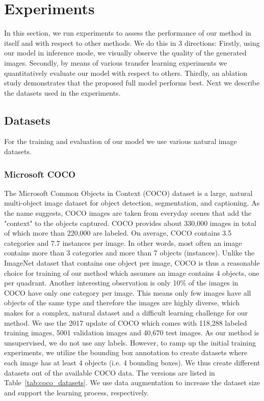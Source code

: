 \documentclass[12pt,a4paper]{article}
\begin{document}
\newpage
\section{Experiments}\label{sec:experiments}
In this section, we run experiments to assess the performance of our method in itself and with respect to other methods. We do this in 3 directions: Firstly, using our model in inference mode, we visually observe the quality of the generated images. Secondly, by means of various transfer learning experiments we quantitatively evaluate our model with respect to others. Thirdly, an ablation study demonstrates that the proposed full model performs best. Next we describe the datasets used in the experiments.

\subsection{Datasets}
For the training and evaluation of our model we use various natural image datasets.

\subsubsection{Microsoft COCO}
The Microsoft Common Objects in Context (COCO) dataset \cite{MsCoco} is a large, natural multi-object image dataset for object detection, segmentation, and captioning.
As the name suggests, COCO images are taken from everyday scenes that add the "context" to the objects captured. COCO provides about 330,000 images in total of which more than 220,000 are labeled. On average, COCO contains 3.5 categories and 7.7 instances per image. In other words, most often an image contains more than 3 categories and more than 7 objects (instances). Unlike the ImageNet dataset that contains one object per image, COCO is thus a reasonable choice for training of our method which assumes an image contains 4 objects, one per quadrant. Another interesting observation is only 10\% of the images in COCO have only one category per image. This means only few images have all objects of the same type and therefore the images are highly diverse, which makes for a complex, natural dataset and a difficult learning challenge for our method. We use the 2017 update of COCO which comes with 118,288 labeled training images, 5001 validation images and 40,670 test images. As our method is unsupervised, we do not use any labels. However, to ramp up the initial training experiments, we utilize the bounding box annotation to create datasets where each image has at least 4 objects (i.e. 4 bounding boxes). We thus create different datasets out of the available COCO data. The versions are listed in Table~\ref{tab:coco_datasets}. We use data augmentation to increase the dataset size and support the learning process, respectively.
\end{document}
